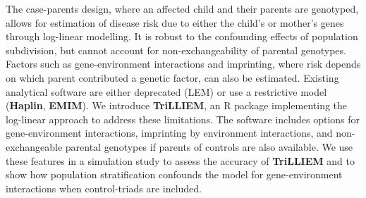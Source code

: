 The case-parents design, where an affected child and their parents are genotyped, allows for estimation of disease risk due to either the child's or mother’s genes through log-linear modelling.
It is robust to the confounding effects of population subdivision, but cannot account for non-exchangeability of parental genotypes.
Factors such as gene-environment interactions and imprinting, where risk depends on which parent contributed a genetic factor, can also be estimated.
Existing analytical software are either deprecated (LEM) or use a restrictive model (\textbf{Haplin}, \textbf{EMIM}).
We introduce \textbf{TriLLIEM}, an R package implementing the log-linear approach to address these limitations.
The software includes options for gene-environment interactions, imprinting by environment interactions, and non-exchangeable parental genotypes if parents of controls are also available.
We use these features in a simulation study to assess the accuracy of \textbf{TriLLIEM} and to show how population stratification confounds the model for gene-environment interactions when control-triads are included.

